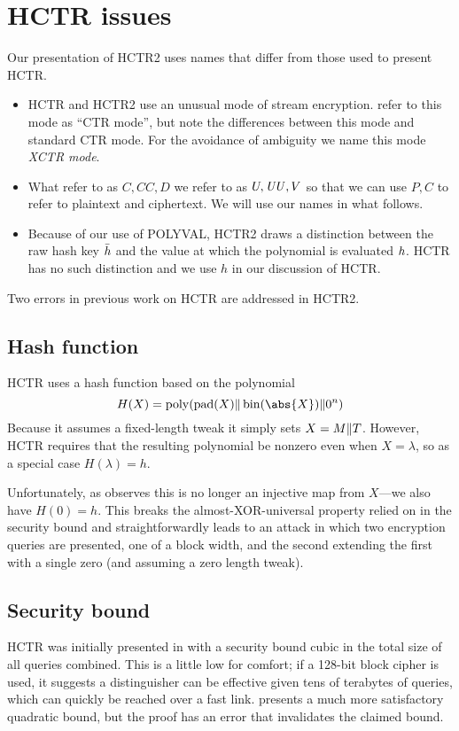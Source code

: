 \documentclass[hctr2.tex]{subfiles}
\begin{document}
\section{HCTR issues}
Our presentation of HCTR2 uses
names that differ from those used to present HCTR\@.

\begin{itemize}
    \item HCTR and HCTR2 use an unusual mode of stream encryption.
    \cite{hctr,hctrquad} refer to this mode as ``CTR mode'',
    but note the differences between this mode and 
    standard CTR mode\cite{ctr}.
    For the avoidance of ambiguity
    we name this mode \emph{XCTR mode}.
    \item What \cite{hctr,hctrquad} refer to as \(C, \mathit{CC}, D\)
    we refer to as \(U, \mathit{UU}, V\)
    so that we can use \(P, C\) to refer to plaintext and ciphertext.
    We will use our names in what follows.
    \item Because of our use of POLYVAL, HCTR2 draws a distinction
    between the raw hash key \(\bar{h}\)
    and the value at which the polynomial is evaluated \(h\).
    HCTR has no such distinction
    and we use \(h\) in our discussion of HCTR\@.
\end{itemize}

Two errors in previous work on HCTR are addressed in HCTR2.

\subsection{Hash function}\label{badhash}
HCTR uses a hash function based on the polynomial
\begin{displaymath}
    H(X) = \poly(\pad(X) \Concat \fromint(\abs{X}) \Concat 0^n)
\end{displaymath}
Because it assumes a fixed-length tweak it simply sets \(X = M \Vert T\).
However, HCTR requires that the resulting polynomial be nonzero
even when \(X = \lambda\),
so as a special case \(H(\lambda) = h\).

Unfortunately, as \cite{kumarhctr} observes this is no longer
an injective map from \(X\)---we also have \(H(0) = h\). This
breaks the almost-XOR-universal property relied on
in the security bound and
straightforwardly leads to an attack in which two encryption queries
are presented, one of a block width, and the second extending
the first with a single zero (and assuming a zero length tweak).

\subsection{Security bound}\label{badproof}
HCTR was initially presented in \cite{hctr} with a security bound cubic
in the total size of all queries combined.  This is a little low
for comfort; if a 128-bit block cipher is used, it suggests a
distinguisher can be effective given tens of terabytes of queries,
which can quickly be reached over a fast link. 
\cite{hctrquad} presents a much more satisfactory quadratic bound,
but the proof has an error that invalidates the claimed bound.
\end{document}
